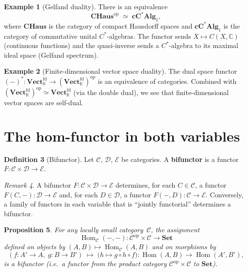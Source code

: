 \documentclass[a4paper,12pt]{book}
\DeclareMathOperator{\Hom}{Hom}
\newcommand{\Set}{\mathbf{Set}}
\newcommand{\Vect}{\mathbf{Vect}}
\newcommand{\op}{\mathrm{op}}
\newcommand{\C}{\mathbb{C}}
\newcommand{\K}{\mathbb{K}}
\theoremstyle{definition}
\newtheorem{definition}{Definition}[section]
\newtheorem{example}[definition]{Example}
\theoremstyle{plain}
\newtheorem{proposition}[definition]{Proposition}
\theoremstyle{remark}
\newtheorem{remark}[definition]{Remark}
\begin{document}
\begin{example}[Gelfand duality]\label{ex:gelfand-duality}
There is an equivalence
\[
    \mathbf{CHaus}^{\op} \;\simeq\; \mathbf{cC^*Alg}_1,
\]
where $\mathbf{CHaus}$ is the category of compact Hausdorff spaces and
$\mathbf{cC^*Alg}_1$ is the category of commutative unital
$C^*$-algebras.  The functor sends $X\mapsto C(X,\C)$
(continuous functions) and the quasi-inverse sends a $C^*$-algebra to
its maximal ideal space (Gelfand spectrum).
\end{example}

\begin{example}[Finite-dimensional vector space duality]\label{ex:fd-vect-duality}
The dual space functor $(-)^*\colon\Vect_\K^{\mathrm{fd}}\to
(\Vect_\K^{\mathrm{fd}})^{\op}$ is an equivalence of categories.
Combined with $(\Vect_\K^{\mathrm{fd}})^{\op}\simeq
\Vect_\K^{\mathrm{fd}}$
(via the double dual), we see that finite-dimensional vector spaces
are self-dual.
\end{example}



\section{The hom-functor in both variables}\label{sec:hom-bifunctor}

\begin{definition}[Bifunctor]\label{def:bifunctor}
Let $\mathcal{C}$, $\mathcal{D}$, $\mathcal{E}$ be categories.
A \textbf{bifunctor} is a functor
$F\colon\mathcal{C}\times\mathcal{D}\to\mathcal{E}$.
\end{definition}

\begin{remark}\label{rem:bifunctor-partial}
A bifunctor $F\colon\mathcal{C}\times\mathcal{D}\to\mathcal{E}$
determines, for each $C\in\mathcal{C}$, a functor
$F(C,-)\colon\mathcal{D}\to\mathcal{E}$ and, for each
$D\in\mathcal{D}$, a functor
$F(-,D)\colon\mathcal{C}\to\mathcal{E}$.
Conversely, a family of functors in each variable that is
``jointly functorial'' determines a bifunctor.
\end{remark}

\begin{proposition}\label{prop:hom-bifunctor}
For any locally small category~$\mathcal{C}$, the assignment
\[
    \Hom_\mathcal{C}(-,-)\colon\mathcal{C}^{\op}\times\mathcal{C}
    \longrightarrow\Set
\]
defined on objects by $(A,B)\mapsto\Hom_\mathcal{C}(A,B)$ and on
morphisms by
\[
    (f\colon A'\to A,\; g\colon B\to B')\;\longmapsto\;
    \bigl(h\mapsto g\circ h\circ f\bigr)
    \colon\Hom(A,B)\to\Hom(A',B'),
\]
is a bifunctor (i.e.\ a functor from the product category
$\mathcal{C}^{\op}\times\mathcal{C}$ to $\Set$).
\end{proposition}
\end{document}
